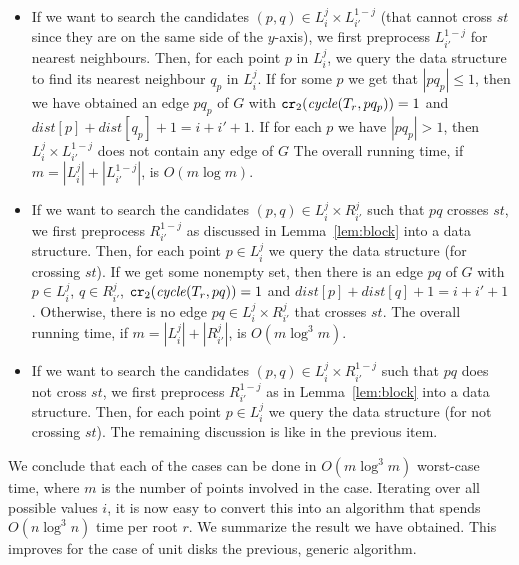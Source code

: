 \documentclass[a4paper,USenglish]{lipics}
\def\dist{\mathit{dist}}
\newcommand{\cycle}{\mathit{cycle}}
\newcommand\CR{\mbox{\tt cr}_2}		  %
\let\le\leqslant
\begin{document}
\begin{itemize}
\item If we want to search the candidates $(p,q)\in L_i^j\times L_{i'}^{1-j}$
	(that cannot cross $st$ since they are on the same side
	of the $y$-axis), we first preprocess $L_{i'}^{1-j}$ for nearest neighbours.
	Then, for each point $p$ in $L_i^j$, we query the data structure
	to find its nearest neighbour $q_p$ in $L_i^j$.
	If for some $p$ we get that $|pq_p|\le 1$, then we have
	obtained an edge $pq_p$ of $G$ with $\CR(\cycle(T_r,pq_p))=1$
	and $\dist[p]+\dist[q_p]+1=i+i'+1$.
	If for each $p$ we have $|pq_p|> 1$, then $L_i^j\times L_{i'}^{1-j}$
	does not contain any edge of $G$
	The overall running time, if $m=|L_i^j|+|L_{i'}^{1-j}|$, is
	$O(m\log m)$.
\item If we want to search the candidates $(p,q)\in L_i^j\times R_{i'}^{j}$
	such that $pq$ crosses $st$,
	we first preprocess $R_{i'}^{1-j}$ as discussed in Lemma~\ref{lem:block}
	into a data structure.
	Then, for each point $p\in L_i^j$ we query the data structure (for crossing $st$).
	If we get some nonempty set, then there is 
	an edge $pq$ of $G$ with $p\in L_i^j$, $q\in R_{i'}^{j}$, $\CR(\cycle(T_r,pq))=1$
	and $\dist[p]+\dist[q]+1=i+i'+1$.
	Otherwise, there is no edge $pq\in L_i^j\times R_{i'}^{j}$ that crosses $st$.
	The overall running time, if $m=|L_i^j|+|R_{i'}^{j}|$, is
	$O(m\log^3 m)$.
\item If we want to search the candidates $(p,q)\in L_i^j\times R_{i'}^{1-j}$
	such that $pq$ does not cross $st$,
	we first preprocess $R_{i'}^{1-j}$ as in Lemma~\ref{lem:block}
	into a data structure.
	Then, for each point $p\in L_i^j$ we query the data structure (for not crossing $st$).
	The remaining discussion is like in the previous item.
\end{itemize}
We conclude that each of the cases can be done in $O(m\log^3 m)$ worst-case time, where
$m$ is the number of points involved in the case.
Iterating over all possible values $i$, 
it is now easy to convert this into an algorithm that spends $O(n\log^3 n)$ time
per root $r$. We summarize the result we have obtained. This improves for the
case of unit disks the previous, generic algorithm.
\end{document}
